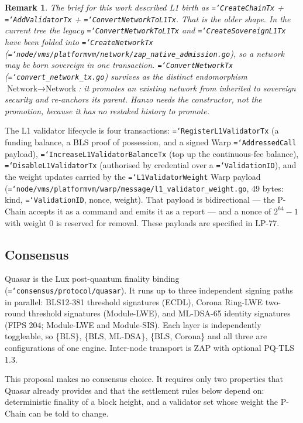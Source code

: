 \documentclass[11pt,a4paper]{article}
\newtheorem{remark}[definition]{Remark}
\newcommand{\code}[1]{\texttt{\hyphenchar\font=`\-\relax #1}}
\begin{document}
\begin{remark}
The brief for this work described L1 birth as
\code{CreateChainTx} + \code{AddValidatorTx} + \code{ConvertNetworkToL1Tx}.
That is the older shape. In the current tree the legacy
\code{ConvertNetworkToL1Tx} and \code{CreateSovereignL1Tx} have been folded into
\code{CreateNetworkTx}
(\code{node/vms/platformvm/network/zap\_native\_admission.go}), so a network may
be \emph{born} sovereign in one transaction. \code{ConvertNetworkTx}
(\code{convert\_network\_tx.go}) survives as the distinct endomorphism
$\text{Network} \to \text{Network}$: it promotes an existing network from
inherited to sovereign security and re-anchors its parent. Hanzo needs the
constructor, not the promotion, because it has no restaked history to promote.
\end{remark}

The L1 validator lifecycle is four transactions:
\code{RegisterL1ValidatorTx} (a funding balance, a BLS proof of possession, and
a signed Warp \code{AddressedCall} payload),
\code{IncreaseL1ValidatorBalanceTx} (top up the continuous-fee balance),
\code{DisableL1ValidatorTx} (authorised by credential over a
\code{ValidationID}), and the weight updates carried by the
\code{L1ValidatorWeight} Warp payload
(\code{node/vms/platformvm/warp/message/l1\_validator\_weight.go}, 49 bytes:
kind, \code{ValidationID}, nonce, weight). That payload is bidirectional --- the
P-Chain accepts it as a command and emits it as a report --- and a nonce of
$2^{64}-1$ with weight $0$ is reserved for removal. These payloads are specified
in LP-77.

\subsection{Consensus}
\label{sec:consensus}

Quasar is the Lux post-quantum finality binding
(\code{consensus/protocol/quasar}). It runs up to three independent signing
paths in parallel: BLS12-381 threshold signatures (ECDL), Corona Ring-LWE
two-round threshold signatures (Module-LWE), and ML-DSA-65 identity signatures
(FIPS 204; Module-LWE and Module-SIS). Each layer is independently toggleable,
so \{BLS\}, \{BLS, ML-DSA\}, \{BLS, Corona\} and all three are configurations of
one engine. Inter-node transport is ZAP with optional PQ-TLS 1.3.

This proposal makes no consensus choice. It requires only two properties that
Quasar already provides and that the settlement rules below depend on:
deterministic finality of a block height, and a validator set whose weight the
P-Chain can be told to change.
\end{document}
